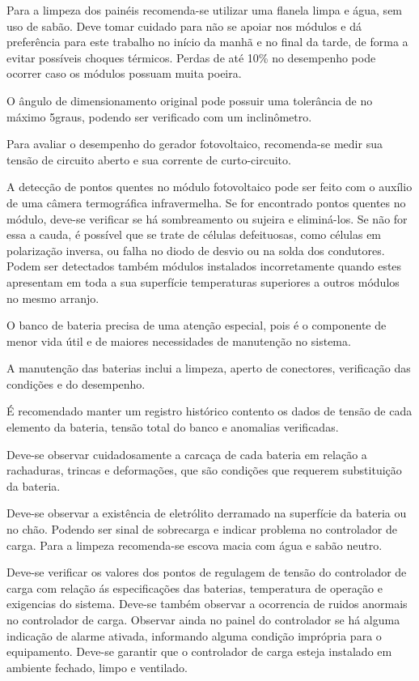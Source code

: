 Para a limpeza dos painéis recomenda-se utilizar uma flanela limpa e água, sem uso de sabão. Deve tomar cuidado para não se apoiar nos módulos e dá preferência para este trabalho no início da manhã e no final da tarde, de forma a evitar possíveis choques térmicos. Perdas de até 10\% no desempenho pode ocorrer caso os módulos possuam muita poeira.

O ângulo de dimensionamento original pode possuir uma tolerância de no máximo 5graus, podendo ser verificado com um inclinômetro.

Para avaliar o desempenho do gerador fotovoltaico, recomenda-se medir sua tensão de circuito aberto e sua corrente de curto-circuito.

A detecção de pontos quentes no módulo fotovoltaico pode ser feito com o auxílio de uma câmera termográfica infravermelha. Se for encontrado pontos quentes no módulo, deve-se verificar se há sombreamento ou sujeira e eliminá-los. Se não for essa a cauda, é possível que se trate de células defeituosas, como células em polarização inversa, ou falha no diodo de desvio ou na solda dos condutores. Podem ser detectados também módulos instalados incorretamente quando estes apresentam em toda a sua superfície temperaturas superiores a outros módulos no mesmo arranjo.

O banco de bateria precisa de uma atenção especial, pois é o componente de menor vida útil e de maiores necessidades de manutenção no sistema. 

A manutenção das baterias inclui a limpeza, aperto de conectores, verificação das condições e do desempenho.

É recomendado manter um registro histórico contento os dados de tensão de cada elemento da bateria, tensão total do banco e anomalias verificadas.

Deve-se observar cuidadosamente a carcaça de cada bateria em relação a rachaduras, trincas e deformações, que são condições que requerem substituição da bateria. 

Deve-se observar a existência de eletrólito derramado na superfície da bateria ou no chão. Podendo ser sinal de sobrecarga e indicar problema no controlador de carga. Para a limpeza recomenda-se escova macia com água e sabão neutro.

Deve-se verificar os valores dos pontos de regulagem de tensão do controlador de carga com relação ás especificações das baterias, temperatura de operação e exigencias do sistema. Deve-se  também observar a ocorrencia de ruidos anormais no controlador de carga. Observar ainda no painel do controlador se há alguma indicação de alarme ativada, informando alguma condição imprópria para o equipamento. Deve-se garantir que o controlador de carga esteja instalado em ambiente fechado, limpo e ventilado.

